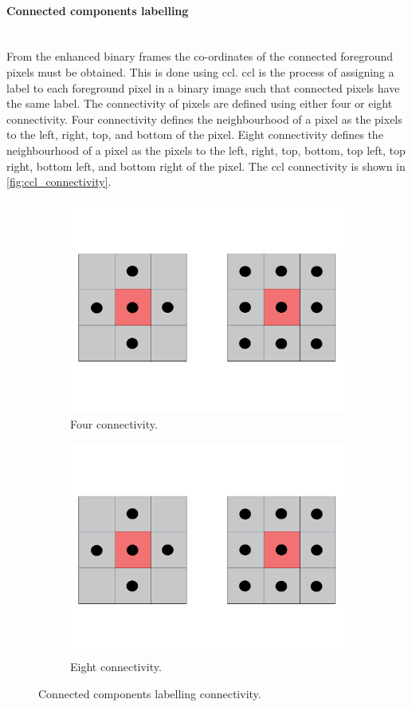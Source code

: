 \paragraph{Connected components labelling}\label{par:ccl}\mbox{}\\
From the enhanced binary frames the co-ordinates of the connected foreground pixels must be obtained. This is done using \gls{ccl}. \Gls{ccl} is the process of assigning a label to each foreground pixel in a binary image such that connected pixels have the same label. The connectivity of pixels are defined using either four or eight connectivity. Four connectivity defines the neighbourhood of a pixel as the pixels to the left, right, top, and bottom of the pixel. Eight connectivity defines the neighbourhood of a pixel as the pixels to the left, right, top, bottom, top left, top right, bottom left, and bottom right of the pixel. The \gls{ccl} connectivity is shown in \autoref{fig:ccl_connectivity}.
\begin{figure}[!htb]
  \centering
  \begin{subfigure}[b]{0.3\textwidth}
    \centering
    \includegraphics[width=0.6\linewidth]{figures/detection/4_pixel_connectivity.pdf}
    \caption{Four connectivity.}
    \label{fig:four_connectivity}
  \end{subfigure}
  \quad
  \begin{subfigure}[b]{0.3\textwidth}
    \centering
    \includegraphics[width=0.6\linewidth]{figures/detection/8_pixel_connectivity.pdf}
    \caption{Eight connectivity.}
    \label{fig:eight_connectivity}
  \end{subfigure}
  \caption{Connected components labelling connectivity.}
  \label{fig:ccl_connectivity}
\end{figure}

